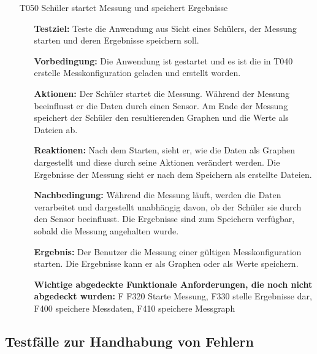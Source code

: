 \documentclass[parskip=full]{scrartcl}
\begin{document}
\begin{itemize}
\begin{itemize}
\end{itemize}

\item[T050] Schüler startet Messung und speichert Ergebnisse
\begin{itemize}

\item []\textbf{Testziel:} Teste die Anwendung aus Sicht eines Schülers, der Messung starten und deren Ergebnisse speichern soll.

\item []\textbf{Vorbedingung:} Die Anwendung ist gestartet und es ist die in T040 erstelle Messkonfiguration geladen und erstellt worden.

\item []\textbf{Aktionen:} Der Schüler startet die Messung. Während der Messung beeinflusst er die Daten durch einen Sensor. Am Ende der Messung speichert der Schüler den resultierenden Graphen und die Werte als Dateien ab.
\item []\textbf{Reaktionen:} Nach dem Starten, sieht er, wie die Daten als Graphen dargestellt und diese durch seine Aktionen verändert werden. Die Ergebnisse der Messung sieht er nach dem Speichern als erstellte Dateien.
\item []\textbf{Nachbedingung:} Während die Messung läuft, werden die Daten verarbeitet und dargestellt unabhängig davon, ob der Schüler sie durch den Sensor beeinflusst. Die Ergebnisse sind zum Speichern verfügbar, sobald die Messung angehalten wurde.


\item []\textbf{Ergebnis:} Der Benutzer die Messung einer gültigen Messkonfiguration starten. Die Ergebnisse kann er als Graphen oder als Werte speichern. 
\item []\textbf{Wichtige abgedeckte Funktionale Anforderungen, die noch nicht abgedeckt wurden:} F F320 Starte Messung, F330 stelle Ergebnisse dar, F400 speichere Messdaten, F410 speichere Messgraph


\end{itemize}
\end{itemize}

\subsection{Testfälle zur Handhabung von Fehlern}
\end{document}
